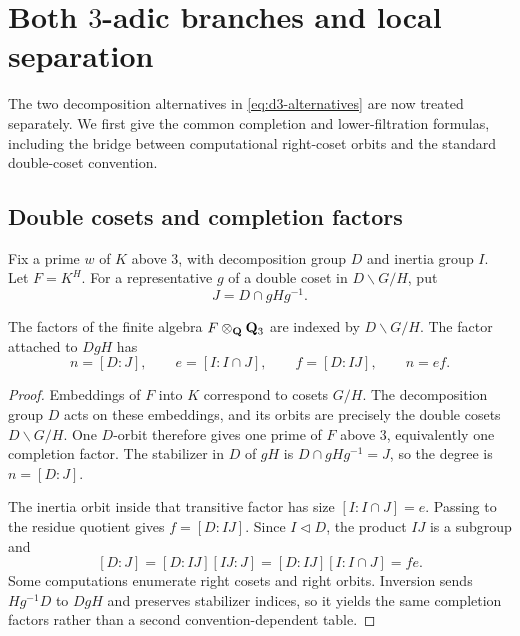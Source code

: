 \section[Both 3-adic branches and local separation]{Both
  \texorpdfstring{$3$}{3}-adic branches and local separation}
\label{sec:local}

The two decomposition alternatives in \eqref{eq:d3-alternatives} are now
treated separately.  We first give the common completion and lower-filtration
formulas, including the bridge between computational right-coset orbits and
the standard double-coset convention.

\subsection{Double cosets and completion factors}

Fix a prime $w$ of $K$ above $3$, with decomposition group $D$ and inertia
group $I$.  Let $F=K^H$.  For a representative $g$ of a double coset in
$D\backslash G/H$, put
\begin{equation}
 J=D\cap gHg^{-1}.
 \label{eq:local-J}
\end{equation}

\begin{lemma}
\label{lem:double-coset-completions}
The factors of the finite \etale{} algebra $F\otimes_{\mathbf{Q}}\mathbf{Q}_{3}$ are indexed
by $D\backslash G/H$.  The factor attached to $DgH$ has
\begin{equation}
 n=[D:J],
 \qquad
 e=[I:I\cap J],
 \qquad
 f=[D:IJ],
 \qquad n=ef.
 \label{eq:nef-formulas}
\end{equation}
\end{lemma}

\begin{proof}
Embeddings of $F$ into $K$ correspond to cosets $G/H$.  The decomposition
group $D$ acts on these embeddings, and its orbits are precisely the double
cosets $D\backslash G/H$.  One $D$-orbit therefore gives one prime of $F$
above $3$, equivalently one completion factor.  The stabilizer in $D$ of
$gH$ is $D\cap gHg^{-1}=J$, so the degree is $n=[D:J]$.

The inertia orbit inside that transitive factor has size
$[I:I\cap J]=e$.  Passing to the residue quotient gives
$f=[D:IJ]$.  Since $I\triangleleft D$, the product $IJ$ is a subgroup and
\[
 [D:J]=[D:IJ][IJ:J]
       =[D:IJ][I:I\cap J]=fe.
\]
Some computations enumerate right cosets and right orbits.  Inversion sends
$Hg^{-1}D$ to $DgH$ and preserves stabilizer indices, so it yields the same
completion factors rather than a second convention-dependent table.
\end{proof}

